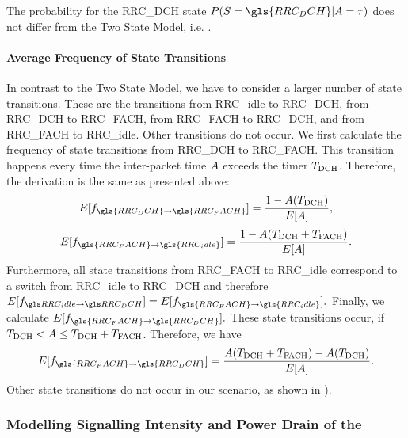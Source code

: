 The probability for the \gls{RRC_DCH} state \(P(\RRCState=\gls{RRC_DCH} \vert \PacketIAT = \ObservationIntervalLength)\) does not differ from the Two State Model, i.e. .

\paragraph*{Average Frequency of State Transitions}

\newcommand{\fStateTransitionsDCHToFACH}{f_{\gls{RRC_DCH}\rightarrow\gls{RRC_FACH}}\xspace}
\newcommand{\fStateTransitionsFACHToIdle}{f_{\gls{RRC_FACH}\rightarrow\gls{RRC_idle}}\xspace}
\newcommand{\fStateTransitionsFACHToDCH}{f_{\gls{RRC_FACH}\rightarrow\gls{RRC_DCH}}\xspace}

In contrast to the Two State Model, we have to consider a larger number of state transitions.
These are the transitions from \gls{RRC_idle} to \gls{RRC_DCH}, from \gls{RRC_DCH} to \gls{RRC_FACH}, from \gls{RRC_FACH} to \gls{RRC_DCH}, and from \gls{RRC_FACH} to \gls{RRC_idle}.
Other transitions do not occur.
We first calculate the frequency of state transitions from \gls{RRC_DCH} to \gls{RRC_FACH}.
This transition happens every time the inter-packet time \(A\) exceeds the timer \(T_{\text{DCH}}\).
Therefore, the derivation is the same as presented above:
\begin{equation*}
E[\fStateTransitionsDCHToFACH]=\frac{1-\PacketIAT(\TDCH)}{E[\PacketIAT]},
\end{equation*}
\begin{equation*}
E[\fStateTransitionsFACHToIdle]=\frac{1-\PacketIAT(\TDCH+\TFACH)}{E[\PacketIAT]}.
\end{equation*}
Furthermore, all state transitions from \gls{RRC_FACH} to \gls{RRC_idle} correspond to a switch from \gls{RRC_idle} to \gls{RRC_DCH} and therefore
\(E[\fStateTransitionsIdleToDCH]=E[\fStateTransitionsFACHToIdle].\)
Finally, we calculate \(E[\fStateTransitionsFACHToDCH].\)
These state transitions occur, if \(T_{\text{DCH}}<A \leq T_{\text{DCH}}+T_{\text{FACH}}\).
Therefore, we have
\begin{equation*}
E[\fStateTransitionsFACHToDCH]=\frac{\PacketIAT(\TDCH+\TFACH)-\PacketIAT(\TDCH)}{E[\PacketIAT]}.
\end{equation*}
Other state transitions do not occur in our scenario, as shown in ).

\subsubsection*{Modelling Signalling Intensity and Power Drain of the }\label{sec:network:performance_model:analytical_model:metrics}

